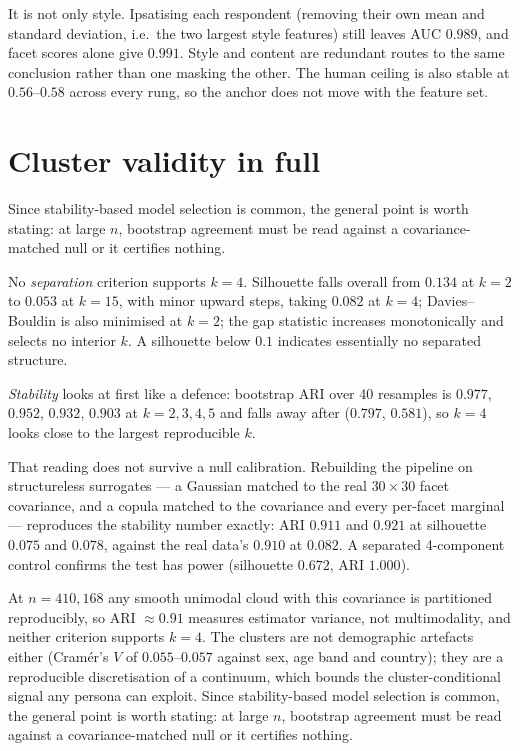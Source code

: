 \documentclass[11pt]{article}
\begin{document}
It is not only style. Ipsatising each respondent (removing their own mean and
standard deviation, i.e.\ the two largest style features) still leaves AUC
$0.989$, and facet scores alone give $0.991$. Style and content are redundant
routes to the same conclusion rather than one masking the other. The human
ceiling is also stable at $0.56$--$0.58$ across every rung, so the anchor does
not move with the feature set.


\section{Cluster validity in full}
\label{app:clusters}

Since stability-based model selection is common, the general point is worth
stating: at large $n$, bootstrap agreement must be read against a
covariance-matched null or it certifies nothing.

No \emph{separation} criterion supports $k{=}4$. Silhouette falls overall from
$0.134$ at $k{=}2$ to $0.053$ at $k{=}15$, with minor upward steps, taking
$0.082$ at $k{=}4$;
Davies--Bouldin is also minimised at $k{=}2$; the gap statistic increases
monotonically and selects no interior $k$. A silhouette below $0.1$ indicates
essentially no separated structure.

\emph{Stability} looks at first like a defence: bootstrap ARI over 40 resamples
is $0.977$, $0.952$, $0.932$, $0.903$ at $k{=}2,3,4,5$ and falls away after
($0.797$, $0.581$), so $k{=}4$ looks close to the largest reproducible $k$.

That reading does not survive a null calibration. Rebuilding the pipeline on
structureless surrogates --- a Gaussian matched to the real $30\times30$ facet
covariance, and a copula matched to the covariance and every per-facet marginal
--- reproduces the stability number exactly: ARI $0.911$ and $0.921$ at
silhouette $0.075$ and $0.078$, against the real data's $0.910$ at $0.082$. A
separated 4-component control confirms the test has power (silhouette $0.672$,
ARI $1.000$).

At $n{=}410{,}168$ any smooth unimodal cloud with this covariance is partitioned
reproducibly, so ARI $\approx0.91$ measures estimator variance, not multimodality,
and neither criterion supports $k{=}4$. The clusters are not demographic
artefacts either (Cram\'er's $V$ of $0.055$--$0.057$ against sex, age band and
country); they are a reproducible discretisation of a continuum, which bounds the
cluster-conditional signal any persona can exploit. Since stability-based model
selection is common, the general point is worth stating: at large $n$, bootstrap
agreement must be read against a covariance-matched null or it certifies
nothing.
\end{document}
